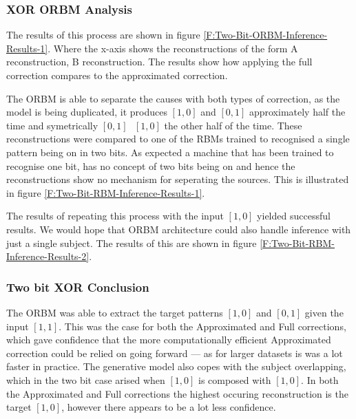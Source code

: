 \subsubsection{XOR ORBM Analysis}

The results of this process are shown in figure \ref{F:Two-Bit-ORBM-Inference-Results-1}. Where the x-axis shows the reconstructions of the form A reconstruction, B reconstruction. The results show how applying the full correction compares to the approximated correction.

The ORBM is able to separate the causes with both types of correction, as the model is being duplicated, it produces $[1,0]$ and $[0,1]$ approximately half the time and symetrically $[0,1]\text{ }[1,0]$ the other half of the time. These reconstructions were compared to one of the RBMs trained to recognised a single pattern being on in two bits. As expected a machine that has been trained to recognise one bit, has no concept of two bits being on and hence the reconstructions show no mechanism for seperating the sources. This is illustrated in figure \ref{F:Two-Bit-RBM-Inference-Results-1}.

The results of repeating this process with the input $[1,0]$ yielded successful results. We would hope that ORBM architecture could also handle inference with just a single subject. The results of this are shown in
figure \ref{F:Two-Bit-RBM-Inference-Results-2}.

\subsubsection{Two bit XOR Conclusion}

The ORBM was able to extract the target patterns $[1,0]$ and $[0,1]$ given the input $[1,1]$. This was the case for both the Approximated and Full corrections, which gave confidence that the more computationally efficient Approximated correction could be relied on going forward --- as for larger datasets is was a lot faster in practice. The generative model also copes with the subject overlapping, which in the two bit case arised when $[1,0]$ is composed with $[1,0]$. In both the Approximated and Full corrections the highest occuring reconstruction is the target $[1,0]$, however there appears to be a lot less confidence.


